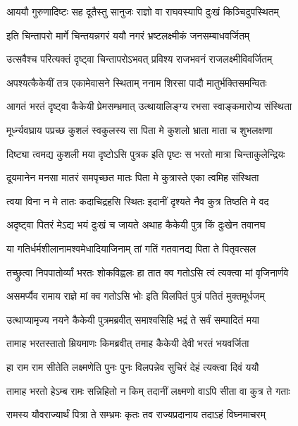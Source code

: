 \twolineshloka
{आययौ गुरुणादिष्टः सह दूतैस्तु सानुजः}
{राज्ञो वा राघवस्यापि दुःखं किञ्चिदुपस्थितम्} %

\twolineshloka
{इति चिन्तापरो मार्गे चिन्तयन्नगरं ययौ}
{नगरं भ्रष्टलक्ष्मीकं जनसम्बाधवर्जितम्} %

\twolineshloka
{उत्सवैश्च परित्यक्तं दृष्ट्वा चिन्तापरोऽभवत्}
{प्रविश्य राजभवनं राजलक्ष्मीविवर्जितम्} %

\twolineshloka
{अपश्यत्कैकेयीं तत्र एकामेवासने स्थिताम्}
{ननाम शिरसा पादौ मातुर्भक्तिसमन्वितः} %

\twolineshloka
{आगतं भरतं दृष्ट्वा कैकेयी प्रेमसम्भ्रमात्}
{उत्थायालिङ्ग्य रभसा स्वाङ्कमारोप्य संस्थिता} %

\twolineshloka
{मूर्ध्न्यवघ्राय पप्रच्छ कुशलं स्वकुलस्य सा}
{पिता मे कुशलो भ्राता माता च शुभलक्षणा} %

\twolineshloka
{दिष्ट्या त्वमद्य कुशली मया दृष्टोऽसि पुत्रक}
{इति पृष्टः स भरतो मात्रा चिन्ताकुलेन्द्रियः} %

\twolineshloka
{दूयमानेन मनसा मातरं समपृच्छत}
{मातः पिता मे कुत्रास्ते एका त्वमिह संस्थिता} %

\twolineshloka
{त्वया विना न मे तातः कदाचिद्रहसि स्थितः}
{इदानीं दृश्यते नैव कुत्र तिष्ठति मे वद} %

\twolineshloka
{अदृष्ट्वा पितरं मेऽद्य भयं दुःखं च जायते}
{अथाह कैकेयी पुत्र किं दुःखेन तवानघ} %

\twolineshloka
{या गतिर्धर्मशीलानामश्वमेधादियाजिनाम्}
{तां गतिं गतवानद्य पिता ते पितृवत्सल} %

\twolineshloka
{तच्छ्रुत्वा निपपातोर्व्यां भरतः शोकविह्वलः}
{हा तात क्व गतोऽसि त्वं त्यक्त्वा मां वृजिनार्णवे} %

\twolineshloka
{असमर्प्यैव रामाय राज्ञे मां क्व गतोऽसि भोः}
{इति विलपितं पुत्रं पतितं मुक्तमूर्धजम्} %

\twolineshloka
{उत्थाप्यामृज्य नयने कैकेयी पुत्रमब्रवीत्}
{समाश्वसिहि भद्रं ते सर्वं सम्पादितं मया} %

\twolineshloka
{तामाह भरतस्तातो म्रियमाणः किमब्रवीत्}
{तमाह कैकेयी देवी भरतं भयवर्जिता} %

\twolineshloka
{हा राम राम सीतेति लक्ष्मणेति पुनः पुनः}
{विलपन्नेव सुचिरं देहं त्यक्त्वा दिवं ययौ} %

\twolineshloka
{तामाह भरतो हेऽम्ब रामः सन्निहितो न किम्}
{तदानीं लक्ष्मणो वाऽपि सीता वा कुत्र ते गताः} %

\twolineshloka
{रामस्य यौवराज्यार्थं पित्रा ते सम्भ्रमः कृतः}
{तव राज्यप्रदानाय तदाऽहं विघ्नमाचरम्} %

